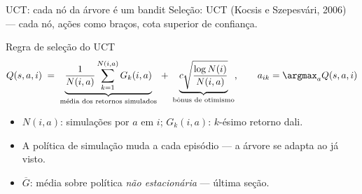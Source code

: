 \documentclass[aspectratio=169, 10pt]{beamer}
\newcommand{\Nvis}{N}
\begin{document}
\begin{frame}{UCT: cada nó da árvore é um bandit}
  \small
  Seleção: UCT (Kocsis e Szepesvári, 2006) — cada nó, ações como braços, cota superior de confiança.

  \begin{teobox}{Regra de seleção do UCT}
    \[
      Q(s,a,i) \;=\; \underbrace{\frac{1}{\Nvis(i,a)}\sum_{k=1}^{\Nvis(i,a)} G_k(i,a)}_{\text{média dos retornos simulados}}
      \;+\; \underbrace{c\sqrt{\frac{\log \Nvis(i)}{\Nvis(i,a)}}}_{\text{bônus de otimismo}},
      \qquad a_{ik} = \argmax_a Q(s,a,i)
    \]
  \end{teobox}

  \begin{itemize}
    \item $\Nvis(i,a)$: simulações por $a$ em $i$; $G_k(i,a)$: $k$-ésimo retorno dali.
    \item \alert{A política de simulação muda a cada episódio} — a árvore se adapta ao já visto.
    \item $\overline{G}$: média sobre política \emph{não estacionária} — última seção.
  \end{itemize}
\end{frame}
\end{document}

